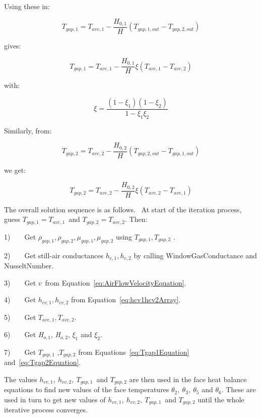 Using these in:

\begin{equation}
{T_{gap,1}} = {T_{ave,1}} - \frac{{{H_{0,1}}}}{H}\left( {{T_{gap,1,out}} - {T_{gap,2,out}}} \right)
\end{equation}

gives:

\begin{equation}
{T_{gap,1}} = {T_{ave,1}} - \frac{{{H_{0,1}}}}{H}\xi \left( {{T_{ave,1}} - {T_{ave,2}}} \right)
\label{eq:Tgap1Equation}
\end{equation}

with:

\begin{equation}
\xi  = \frac{{(1 - {\xi_1})(1 - {\xi_2})}}{{1 - {\xi_1}{\xi_2}}}
\end{equation}

Similarly, from:

\begin{equation}
{T_{gap,2}} = {T_{ave,2}} - \frac{{{H_{0,2}}}}{H}\left( {{T_{gap,2,out}} - {T_{gap,1,out}}} \right)
\end{equation}

we get:

\begin{equation}
{T_{gap,2}} = {T_{ave,2}} - \frac{{{H_{0,2}}}}{H}\xi \left( {{T_{ave,2}} - {T_{ave,1}}} \right)
\label{eq:Tgap2Equation}
\end{equation}

The overall solution sequence is as follows.~ At start of the iteration process, guess \({T_{gap,1}} = {T_{ave,1}}\)~and \({T_{gap,2}} = {T_{ave,2}}\). Then:

1)~~~~Get \({\rho_{gap,1}},{\rho_{gap,2}},{\mu_{gap,1}},{\mu_{gap,2}}\) using \({T_{gap,1}},{T_{gap,2}}\) .

2)~~~~Get still-air conductances \({h_{c,1}},{h_{c,2}}\) by calling WindowGasConductance and NusseltNumber.

3)~~~~Get \(v\)~from Equation~\ref{eq:AirFlowVelocityEquation}.

4)~~~~Get \({h_{cv,1}},{h_{cv,2}}\) from Equation~\ref{eq:hcv1hcv2Array}.

5)~~~~Get \({T_{ave,1}},{T_{ave,2}}\).

6)~~~~Get \emph{H\(_{o,1}\)}, \emph{H\(_{o,2}\)}, \({\xi_1}\) and \({\xi_2}\).

7)~~~~Get \({T_{gap,1}}\) ,\({T_{gap,2}}\) from Equations~\ref{eq:Tgap1Equation} and~\ref{eq:Tgap2Equation}.

The values \({h_{cv,1}}{\mathrm{,~}}{h_{cv,2}}{\mathrm{,~}}{T_{gap,1}}\)~and \({T_{gap,2}}\) are then used in the face heat balance equations to find new values of the face temperatures \({\theta_2}{\mathrm{,~}}{\theta_3},{\mathrm{~}}{\theta_5}\) and \({\theta_6}\). These are used in turn to get new values of \({h_{cv,1}}{\mathrm{,~}}{h_{cv,2}}{\mathrm{,~}}{T_{gap,1}}\)~and \({T_{gap,2}}\) until the whole iterative process converges.

